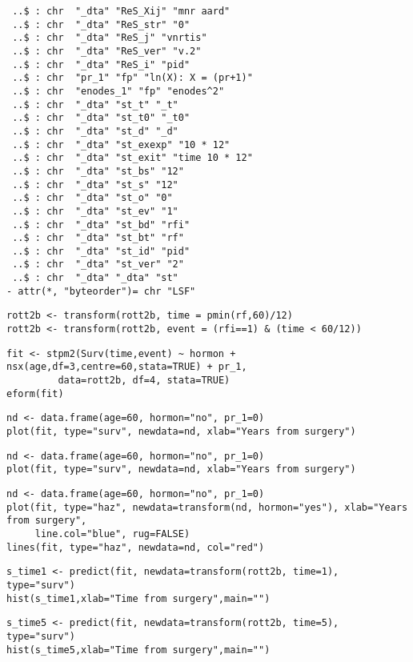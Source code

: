 \documentclass[11pt]{article}
\begin{document}
\begin{verbatim}
 ..$ : chr  "_dta" "ReS_Xij" "mnr aard"
 ..$ : chr  "_dta" "ReS_str" "0"
 ..$ : chr  "_dta" "ReS_j" "vnrtis"
 ..$ : chr  "_dta" "ReS_ver" "v.2"
 ..$ : chr  "_dta" "ReS_i" "pid"
 ..$ : chr  "pr_1" "fp" "ln(X): X = (pr+1)"
 ..$ : chr  "enodes_1" "fp" "enodes^2"
 ..$ : chr  "_dta" "st_t" "_t"
 ..$ : chr  "_dta" "st_t0" "_t0"
 ..$ : chr  "_dta" "st_d" "_d"
 ..$ : chr  "_dta" "st_exexp" "10 * 12"
 ..$ : chr  "_dta" "st_exit" "time 10 * 12"
 ..$ : chr  "_dta" "st_bs" "12"
 ..$ : chr  "_dta" "st_s" "12"
 ..$ : chr  "_dta" "st_o" "0"
 ..$ : chr  "_dta" "st_ev" "1"
 ..$ : chr  "_dta" "st_bd" "rfi"
 ..$ : chr  "_dta" "st_bt" "rf"
 ..$ : chr  "_dta" "st_id" "pid"
 ..$ : chr  "_dta" "st_ver" "2"
 ..$ : chr  "_dta" "_dta" "st"
- attr(*, "byteorder")= chr "LSF"
\end{verbatim}

\begin{verbatim}
rott2b <- transform(rott2b, time = pmin(rf,60)/12)
rott2b <- transform(rott2b, event = (rfi==1) & (time < 60/12))
\end{verbatim}

\begin{verbatim}
fit <- stpm2(Surv(time,event) ~ hormon + nsx(age,df=3,centre=60,stata=TRUE) + pr_1, 
	     data=rott2b, df=4, stata=TRUE)
eform(fit)
\end{verbatim}



\begin{verbatim}
nd <- data.frame(age=60, hormon="no", pr_1=0)
plot(fit, type="surv", newdata=nd, xlab="Years from surgery")
\end{verbatim}


\begin{verbatim}
nd <- data.frame(age=60, hormon="no", pr_1=0)
plot(fit, type="surv", newdata=nd, xlab="Years from surgery")
\end{verbatim}

\begin{verbatim}
nd <- data.frame(age=60, hormon="no", pr_1=0)
plot(fit, type="haz", newdata=transform(nd, hormon="yes"), xlab="Years from surgery",
     line.col="blue", rug=FALSE)
lines(fit, type="haz", newdata=nd, col="red")
\end{verbatim}

\begin{verbatim}
s_time1 <- predict(fit, newdata=transform(rott2b, time=1), type="surv")
hist(s_time1,xlab="Time from surgery",main="")
\end{verbatim}

\begin{verbatim}
s_time5 <- predict(fit, newdata=transform(rott2b, time=5), type="surv")
hist(s_time5,xlab="Time from surgery",main="")
\end{verbatim}
\end{document}
